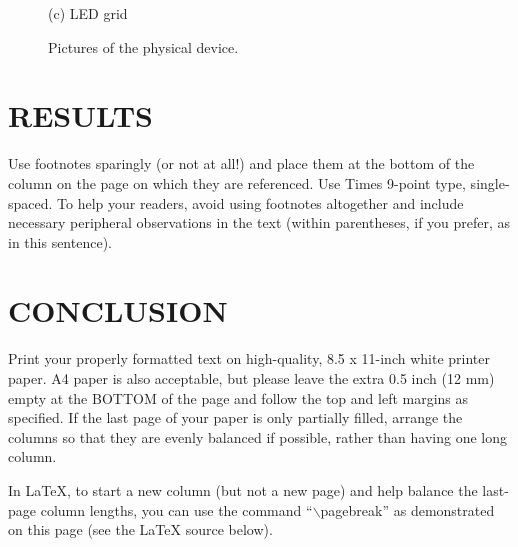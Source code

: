 \documentclass{article}
\begin{document}
\begin{center}
\begin{figure}[ht]
\begin{minipage}[b]{0.48\linewidth}
  \centerline{(c) LED grid}\medskip
\end{minipage}
%
\caption{Pictures of the physical device.}
\label{figures}
%
\end{figure}
\end{center}



\section{RESULTS}
\label{sec:results}

Use footnotes sparingly (or not at all!) and place them at the bottom of the
column on the page on which they are referenced. Use Times 9-point type,
single-spaced. To help your readers, avoid using footnotes altogether and
include necessary peripheral observations in the text (within parentheses, if
you prefer, as in this sentence).



\section{CONCLUSION}
\label{sec:conclusion}

Print your properly formatted text on high-quality, 8.5 x 11-inch white printer
paper. A4 paper is also acceptable, but please leave the extra 0.5 inch (12 mm)
empty at the BOTTOM of the page and follow the top and left margins as
specified.  If the last page of your paper is only partially filled, arrange
the columns so that they are evenly balanced if possible, rather than having
one long column.

In LaTeX, to start a new column (but not a new page) and help balance the
last-page column lengths, you can use the command ``$\backslash$pagebreak'' as
demonstrated on this page (see the LaTeX source below).






\end{document}
